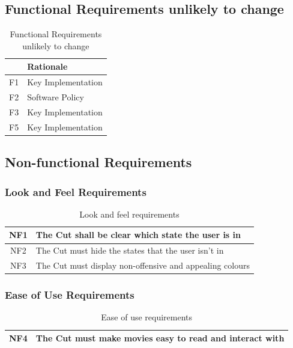 \documentclass[titlepage]{article}
\begin{document}
\subsection{Functional Requirements unlikely to change}
\begin{table}[H]
    \centering
    \begin{tabularx}{\textwidth}{|c|X|} \hline
         & \textbf{Rationale} \\ \hline
        F1 & Key Implementation \\ \hline
        F2 & Software Policy \\ \hline
        F3 & Key Implementation\\ \hline
        F5 & Key Implementation \\ \hline
    \end{tabularx}
    \caption{Functional Requirements unlikely to change}
    \label{tab:Functional_unlikely}
\end{table}

\subsection{Non-functional Requirements}
\subsubsection{Look and Feel Requirements}
\begin{table}[H]
    \centering
    \begin{tabularx}{\textwidth}{|c|X|} \hline
        NF1 & The Cut shall be clear which state the user is in \\ \hline
        NF2 & The Cut must hide the states that the user isn't in \\ \hline
        NF3 & The Cut must display non-offensive and appealing colours \\ \hline
    \end{tabularx}
    \caption{Look and feel requirements}
    \label{tab:NonFunctional-look and feel}
\end{table}

\subsubsection{Ease of Use Requirements}
\begin{table}[H]
    \centering
    \begin{tabularx}{\textwidth}{|c|X|} \hline
        NF4 & The Cut must make movies easy to read and interact with \\ \hline
    \end{tabularx}
    \caption{Ease of use requirements}
    \label{tab:NonFunctional-ease of use}
\end{table}
\end{document}
